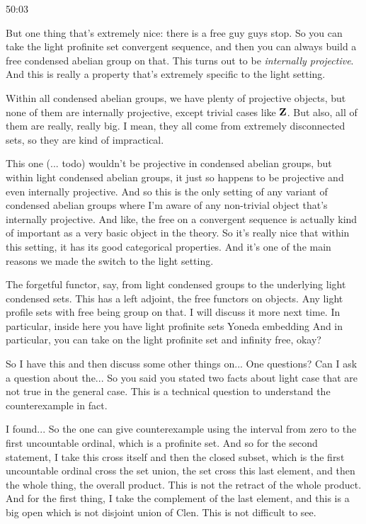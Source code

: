 \begin{example}
\begin{unfinished}{50:03}
\begin{remark}
But one thing that's extremely nice: there is a free guy guys stop. So you can take the light profinite set convergent sequence, and then you can always build a free condensed abelian group on that. This turns out to be \emph{internally projective}. And this is really a property that's extremely specific to the light setting.

Within all condensed abelian groups, we have plenty of projective objects, but none of them are internally projective, except trivial cases like $\mathbf Z$. But also, all of them are really, really big. I mean, they all come from extremely disconnected sets, so they are kind of impractical.

This one (\Z ... todo) wouldn't be projective in condensed abelian groups, but within light condensed abelian groups, it just so happens to be projective and even internally projective. And so this is the only setting of any variant of condensed abelian groups where I'm aware of any non-trivial object that's internally projective. And like, the free  on a convergent sequence is actually kind of important as a very basic object in the theory. So it's really nice that within this setting, it has its good categorical properties. And it's one of the main reasons we made the switch to the light setting.

The forgetful functor, say, from light condensed groups to the underlying light condensed sets. This has a left adjoint, the free functors on objects. Any light profile sets with free being group on that. I will discuss it more next time. 
In particular, inside here you have light profinite sets Yoneda embedding  And in particular, you can take on the light profinite set and infinity free, okay?

So I have this and then discuss some other things on... One questions? Can I ask a question about the... So you said you stated two facts about light case that are not true in the general case. This is a technical question to understand the counterexample in fact.

I found... So the one can give counterexample using the interval from zero to the first uncountable ordinal, which is a profinite set. And so for the second statement, I take this cross itself and then the closed subset, which is the first uncountable ordinal cross the set union, the set cross this last element, and then the whole thing, the overall product. This is not the retract of the whole product. And for the first thing, I take the complement of the last element, and this is a big open which is not disjoint union of Clen. This is not difficult to see.


\end{remark}
\end{unfinished}
\end{example}
